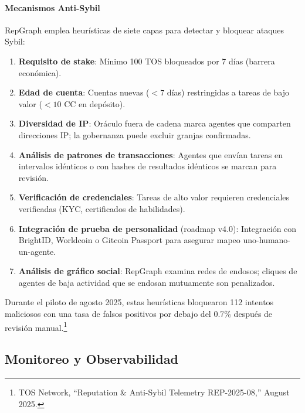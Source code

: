 \documentclass[11pt]{article}
\begin{document}
\paragraph{Mecanismos Anti-Sybil} RepGraph emplea heurísticas de siete capas para detectar y bloquear ataques Sybil:
\begin{enumerate}[noitemsep]
  \item \textbf{Requisito de stake}: Mínimo 100 TOS bloqueados por 7 días (barrera económica).
  \item \textbf{Edad de cuenta}: Cuentas nuevas ($<7$ días) restringidas a tareas de bajo valor ($<10$ CC en depósito).
  \item \textbf{Diversidad de IP}: Oráculo fuera de cadena marca agentes que comparten direcciones IP; la gobernanza puede excluir granjas confirmadas.
  \item \textbf{Análisis de patrones de transacciones}: Agentes que envían tareas en intervalos idénticos o con hashes de resultados idénticos se marcan para revisión.
  \item \textbf{Verificación de credenciales}: Tareas de alto valor requieren credenciales verificadas (KYC, certificados de habilidades).
  \item \textbf{Integración de prueba de personalidad} (roadmap v4.0): Integración con BrightID, Worldcoin o Gitcoin Passport para asegurar mapeo uno-humano-un-agente.
  \item \textbf{Análisis de gráfico social}: RepGraph examina redes de endosos; cliques de agentes de baja actividad que se endosan mutuamente son penalizados.
\end{enumerate}
Durante el piloto de agosto 2025, estas heurísticas bloquearon 112 intentos maliciosos con una tasa de falsos positivos por debajo del 0.7\% después de revisión manual.\footnote{TOS Network, ``Reputation \& Anti-Sybil Telemetry REP-2025-08,'' August 2025.}

\subsection{Monitoreo y Observabilidad}
\end{document}
